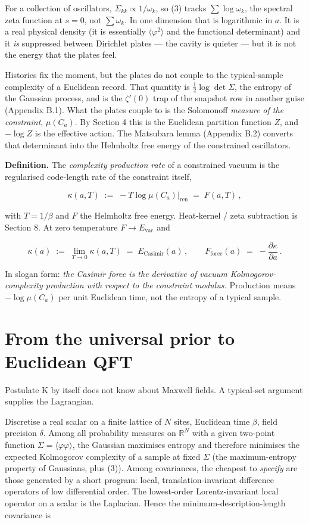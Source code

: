 \documentclass[11pt,letterpaper]{article}
\begin{document}
For a collection of oscillators, \(\Sigma_{kk}\propto 1/\omega_k\), so (3) tracks \(\sum\log\omega_k\), the spectral zeta function at \(s=0\), not \(\sum\omega_k\). In one dimension that is logarithmic in \(a\). It is a real physical density (it is essentially \(\langle\varphi^{2}\rangle\) and the functional determinant) and it \emph{is} suppressed between Dirichlet plates — the cavity is quieter — but it is not the energy that the plates feel.


Histories fix the moment, but the plates do not couple to the typical-sample complexity of a Euclidean record. That quantity is \(\tfrac12\log\det\Sigma\), the entropy of the Gaussian process, and is the \(\zeta'(0)\) trap of the snapshot row in another guise (Appendix B.1). What the plates couple to is the Solomonoff \emph{measure of the constraint}, \(\mu(C_a)\). By Section 4 this is the Euclidean partition function \(Z\), and \(-\log Z\) is the effective action. The Matsubara lemma (Appendix B.2) converts that determinant into the Helmholtz free energy of the constrained oscillators.


\textbf{Definition.} The \emph{complexity production rate} of a constrained vacuum is the regularised code-length rate of the constraint itself,


\[
\kappa(a,T)\;:=\;-T\log\mu(C_a)\big|_{\mathrm{ren}}\;=\;F(a,T)\,,
\tag{4}
\]


with \(T=1/\beta\) and \(F\) the Helmholtz free energy. Heat-kernel / zeta subtraction is Section 8. At zero temperature \(F\to E_{\mathrm{vac}}\) and


\[
\kappa(a)\;:=\;\lim_{T\to 0}\kappa(a,T)\;=\;E_{\mathrm{Casimir}}(a)\,,
\qquad
F_{\mathrm{force}}(a)\;=\;-\frac{\partial\kappa}{\partial a}\,.
\tag{5}
\]


In slogan form: \emph{the Casimir force is the derivative of vacuum Kolmogorov-complexity production with respect to the constraint modulus.} Production means \(-\log\mu(C_a)\) per unit Euclidean time, not the entropy of a typical sample.



\section{From the universal prior to Euclidean QFT}


Postulate K by itself does not know about Maxwell fields. A typical-set argument supplies the Lagrangian.


Discretise a real scalar on a finite lattice of \(N\) sites, Euclidean time \(\beta\), field precision \(\delta\). Among all probability measures on \(\mathbb{R}^N\) with a given two-point function \(\Sigma=\langle\varphi\varphi\rangle\), the Gaussian maximises entropy and therefore minimises the expected Kolmogorov complexity of a sample at fixed \(\Sigma\) (the maximum-entropy property of Gaussians, plus (3)). Among covariances, the cheapest to \emph{specify} are those generated by a short program: local, translation-invariant difference operators of low differential order. The lowest-order Lorentz-invariant local operator on a scalar is the Laplacian. Hence the minimum-description-length covariance is
\end{document}
